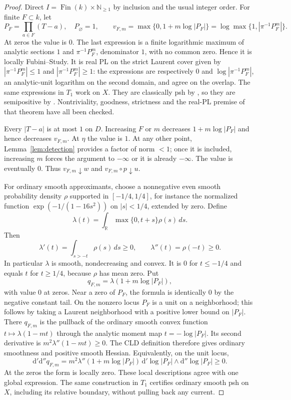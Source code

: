 \documentclass[11pt]{article}
\newcommand{\Fin}{\operatorname{Fin}}
\newcommand{\dd}{\mathrm d'\mathrm d''}
\begin{document}
\begin{proof}
Direct $I=\Fin(k)\times\mathbb N_{\ge1}$ by inclusion and the usual
integer order. For finite $F\subset k$, let
\[
P_F=\prod_{a\in F}(T-a),\quad P_\varnothing=1,\qquad
v_{F,m}=\max\{0,1+m\log|P_F|\}
=\log\max\{1,|\pi^{-1}P_F^m|\}.
\]
At zeros the value is $0$. The last expression is a finite logarithmic
maximum of analytic sections $1$ and $\pi^{-1}P_F^m$, denominator $1$,
with no common zero. Hence it is locally Fubini--Study. It is real PL
on the strict Laurent cover given by $|\pi^{-1}P_F^m|\le1$ and
$|\pi^{-1}P_F^m|\ge1$: the expressions are respectively $0$ and
$\log|\pi^{-1}P_F^m|$, an analytic-unit logarithm on the second domain,
and agree on the overlap. The same expressions in $T_1$ work on $X$.
They are classically psh by \cite[Proposition~4.2(2),(3)]{GR}, so they
are semipositive by \cite[Theorem~4.3]{GR}. Nontriviality, goodness,
strictness and the real-PL premise of that theorem have all been checked.

Every $|T-a|$ is at most $1$ on $D$. Increasing $F$ or $m$ decreases
$1+m\log|P_F|$ and hence decreases $v_{F,m}$. At $\eta$ the value is
$1$. At any other point, Lemma~\ref{lem:detection} provides a factor of
norm $<1$; once it is included, increasing $m$ forces the argument to
$-\infty$ or it is already $-\infty$. The value is eventually $0$.
Thus $v_{F,m}\downarrow w$ and $v_{F,m}\circ p\downarrow u$.

For ordinary smooth approximants, choose a nonnegative even smooth
probability density $\rho$ supported in $[-1/4,1/4]$, for instance the
normalized function $\exp(-1/(1-16s^2))$ on $|s|<1/4$, extended by
zero. Define
\[
\lambda(t)=\int_{\mathbb R}\max\{0,t+s\}\rho(s)\,ds.
\]
Then
\[
\lambda'(t)=\int_{s>-t}\rho(s)\,ds\ge0,\qquad
\lambda''(t)=\rho(-t)\ge0.
\]
In particular $\lambda$ is smooth, nondecreasing and convex. It is
$0$ for $t\le-1/4$ and equals $t$ for $t\ge1/4$, because $\rho$ has
mean zero. Put
\[
q_{F,m}=\lambda(1+m\log|P_F|),
\]
with value $0$ at zeros. Near a zero of $P_F$, the formula is identically
$0$ by the negative constant tail. On the nonzero locus $P_F$ is a
unit on a neighborhood; this follows by taking a Laurent neighborhood
with a positive lower bound on $|P_F|$. There $q_{F,m}$ is the pullback
of the ordinary smooth convex function $t\mapsto\lambda(1-mt)$ through
the analytic moment map $t=-\log|P_F|$. Its second derivative is
$m^2\lambda''(1-mt)\ge0$. The CLD definition therefore gives ordinary
smoothness and positive smooth Hessian. Equivalently, on the unit locus,
\[
\dd q_{F,m}
=m^2\lambda''(1+m\log|P_F|)
\,\mathrm d'\log|P_F|\wedge\mathrm d''\log|P_F|\ge0.
\]
At the zeros the form is locally zero. These local descriptions agree
with one global expression. The same construction in $T_1$ certifies
ordinary smooth psh on $X$, including its relative boundary, without
pulling back any current.


\end{proof}
\end{document}
